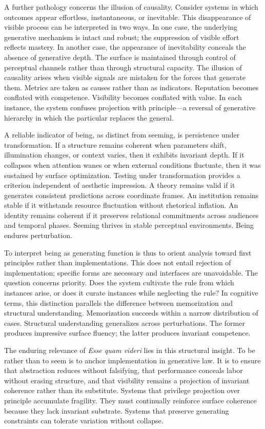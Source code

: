\documentclass[11pt]{article}
\begin{document}
A further pathology concerns the illusion of causality. Consider systems in which outcomes appear effortless, instantaneous, or inevitable. This disappearance of visible process can be interpreted in two ways. In one case, the underlying generative mechanism is intact and robust; the suppression of visible effort reflects mastery. In another case, the appearance of inevitability conceals the absence of generative depth. The surface is maintained through control of perceptual channels rather than through structural capacity. The illusion of causality arises when visible signals are mistaken for the forces that generate them. Metrics are taken as causes rather than as indicators. Reputation becomes conflated with competence. Visibility becomes conflated with value. In each instance, the system confuses projection with principle---a reversal of generative hierarchy in which the particular replaces the general.

A reliable indicator of being, as distinct from seeming, is persistence under transformation. If a structure remains coherent when parameters shift, illumination changes, or context varies, then it exhibits invariant depth. If it collapses when attention wanes or when external conditions fluctuate, then it was sustained by surface optimization. Testing under transformation provides a criterion independent of aesthetic impression. A theory remains valid if it generates consistent predictions across coordinate frames. An institution remains stable if it withstands resource fluctuation without rhetorical inflation. An identity remains coherent if it preserves relational commitments across audiences and temporal phases. Seeming thrives in stable perceptual environments. Being endures perturbation.

To interpret being as generating function is thus to orient analysis toward first principles rather than implementations. This does not entail rejection of implementation; specific forms are necessary and interfaces are unavoidable. The question concerns priority. Does the system cultivate the rule from which instances arise, or does it curate instances while neglecting the rule? In cognitive terms, this distinction parallels the difference between memorization and structural understanding. Memorization succeeds within a narrow distribution of cases. Structural understanding generalizes across perturbations. The former produces impressive surface fluency; the latter produces invariant competence.

The enduring relevance of \textit{Esse quam videri} lies in this structural insight. To be rather than to seem is to anchor implementation in generative law. It is to ensure that abstraction reduces without falsifying, that performance conceals labor without erasing structure, and that visibility remains a projection of invariant coherence rather than its substitute. Systems that privilege projection over principle accumulate fragility. They must continually reinforce surface coherence because they lack invariant substrate. Systems that preserve generating constraints can tolerate variation without collapse.
\end{document}
